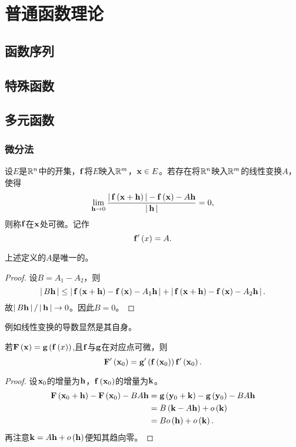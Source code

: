 \documentclass{ctexrep}
\begin{document}
\fi


\chapter{普通函数理论}
  \section{函数序列}
  \section{特殊函数}
  \section{多元函数}
  \subsection{微分法}
  \begin{definition}
    设$E$是$\R^n$中的开集，$\bv{f}$将$E$映入$\R^m$，$\bv{x}\in E$。若存在将$\R^n$映入$\R^m$的线性变换$A$，使得
    \[ \lim_{\bv{h}\to 0} \frac{\abs{\bv{f}\pare{\bv{x}+\bv{h}}}-\bv{f}\pare{\bv{x}}-A\bv{h}}{\abs{\bv{h}}} = 0, \]
    则称$\bv{f}$在$\bv{x}$处可微。记作
    \[ \bv{f}'\pare{x}=A. \]
  \end{definition}
  \begin{theorem}
    上述定义的$A$是唯一的。
  \end{theorem}
  \begin{proof}
    设$B=A_1-A_2$，则
    \[ \abs{B\bfh}\le\abs{\bff\pare{\bfx+\bfh}-\bff\pare{\bfx}-A_1\bfh}+\abs{\bff\pare{\bfx+\bfh}-\bff\pare{\bfx}-A_2\bfh}. \]
    故$\abs{B\bfh}/\abs{\bfh}\to 0$。因此$B=0$。
  \end{proof}
  例如线性变换的导数显然是其自身。
  \begin{theorem}
    若$\bfF\pare{\bfx} = \bfg\pare{\bff\pare{x}}$,且$\bff$与$\bfg$在对应点可微，则
    \[ \bfF'\pare{\bfx_0} = \bfg'\pare{\bff\pare{\bfx_0}}\bff'\pare{\bfx_0}. \]
  \end{theorem}
  \begin{proof}
    设$\bfx_0$的增量为$\bfh$，$\bff\pare{\bfx_0}$的增量为$\bfk$。
    \begin{align*}
      \bfF\pare{\bfx_0+\bfh}-\bfF\pare{\bfx_0}-BA\bfh &= \bfg\pare{\bfy_0+\bfk} - \bfg\pare{\bfy_0}-BA\bfh \\
      &= B\pare{\bfk-A\bfh}+\oo{\bfk} \\
      &= B\oo{\bfh} + \oo{\bfk}.
    \end{align*}
    再注意$\bfk = A \bfh + \oo{\bfh}$便知其趋向零。
  \end{proof}
\end{document}
